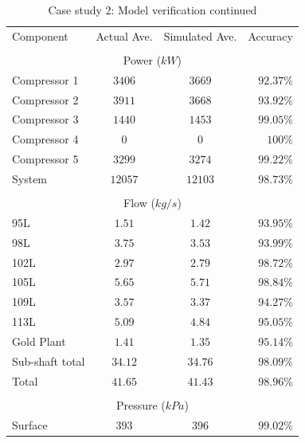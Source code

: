 \begin{appendices}
\newpage
\begin{table}[h!]
	\centering
	\begin{tabular}{lccr}
		\hline 
		Component & Actual Ave. & Simulated  Ave. & Accuracy \\ \hhline{====} 
		\\
		\multicolumn{4}{c}{Power ($ kW $)}
		\\
		Compressor 1 & $ 3406 $ & $ 3669 $ & $ 92.37 $\% \\
		Compressor 2 & $ 3911 $ & $ 3668 $ & $ 93.92 $\% \\
		Compressor 3 & $ 1440 $ & $ 1453 $ & $ 99.05 $\% \\
		Compressor 4 & $  0   $ & $  0   $ & $ 100   $\% \\
		Compressor 5 & $ 3299 $ & $ 3274 $ & $ 99.22 $\% \\
		System       & $12057 $ & $12103 $ & $ 98.73 $\% \\
		\\
		\multicolumn{4}{c}{Flow ($ kg/s $)}
		\\
		
		95L  & $ 1.51 $ & $ 1.42 $ & $ 93.95 $\% \\
		98L  & $ 3.75 $ & $ 3.53 $ & $ 93.99 $\% \\
		102L  & $ 2.97 $ & $ 2.79 $ & $ 98.72 $\% \\
		105L  & $ 5.65 $ & $ 5.71 $ & $ 98.84 $\% \\
		109L  & $ 3.57 $ & $ 3.37 $ & $ 94.27 $\% \\
		113L  & $ 5.09 $ & $ 4.84 $ & $ 95.05 $\% \\
		Gold Plant & $ 1.41 $ & $ 1.35 $ & $ 95.14 $\% \\
		Sub-shaft total & $ 34.12 $ & $ 34.76 $ & $ 98.09 $\% \\
		Total & $ 41.65$  & $41.43 $  & $ 98.96 $\% \\
		\\
		\multicolumn{4}{c}{Pressure ($ kPa $)}
		\\
		
		Surface & $ 393 $ & $ 396 $ & $ 99.02 $\% \\
		\hline 
	\end{tabular}
	\caption{Case study 2: Model verification continued}
	\label{Table: B verification}
\end{table}


\end{appendices}
